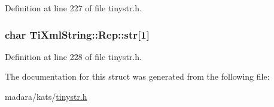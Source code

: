 Definition at line 227 of file tinystr.h.

\hypertarget{structTiXmlString_1_1Rep_a88a7037a489827ec9e59b008e11342b0}{
\subsubsection[{str}]{\setlength{\rightskip}{0pt plus 5cm}char {\bf TiXmlString::Rep::str}\mbox{[}1\mbox{]}}}
\label{da/d0f/structTiXmlString_1_1Rep_a88a7037a489827ec9e59b008e11342b0}


Definition at line 228 of file tinystr.h.



The documentation for this struct was generated from the following file:\begin{DoxyCompactItemize}
\item 
madara/kats/\hyperlink{tinystr_8h}{tinystr.h}\end{DoxyCompactItemize}
